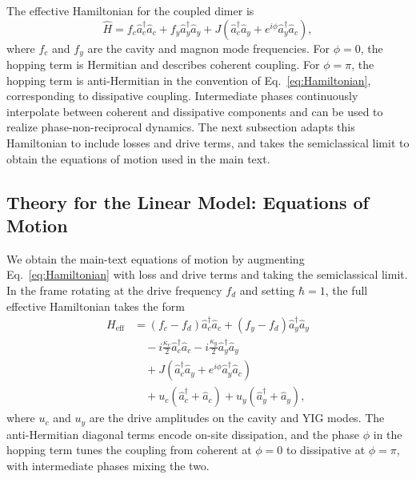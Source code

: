 \documentclass[%
  reprint,
  amsmath,amssymb,
  aps,
  prapplied,
  superscriptaddress,
  longbibliography]{revtex4-2}
\begin{document}
The effective Hamiltonian for the coupled dimer is
\begin{equation}\label{eq:Hamiltonian}
\hat{H} = f_c \hat{a}_c^\dagger \hat{a}_c + f_y \hat{a}_y^\dagger \hat{a}_y + J \left( \hat{a}_c^\dagger \hat{a}_y + e^{i\phi} \hat{a}_y^\dagger \hat{a}_c \right),
\end{equation}
where $f_c$ and $f_y$ are the cavity and magnon mode frequencies. For $\phi=0$, the hopping term is Hermitian and describes coherent coupling. For $\phi=\pi$, the hopping term is anti-Hermitian in the convention of Eq.~\ref{eq:Hamiltonian}, corresponding to dissipative coupling. Intermediate phases continuously interpolate between coherent and dissipative components and can be used to realize phase-non-reciprocal dynamics. The next subsection adapts this Hamiltonian to include losses and drive terms, and takes the semiclassical limit to obtain the equations of motion used in the main text.

\subsection{Theory for the Linear Model: Equations of Motion}

We obtain the main-text equations of motion by augmenting Eq.~\ref{eq:Hamiltonian} with loss and drive terms and taking the semiclassical limit. In the frame rotating at the drive frequency $f_d$ and setting $\hbar = 1$, the full effective Hamiltonian takes the form
\begin{align}
H_{\text{eff}} &= (f_c - f_d) \hat{a}_c^\dagger \hat{a}_c + (f_y - f_d) \hat{a}_y^\dagger \hat{a}_y \nonumber \\
&\quad - i \frac{\kappa_c}{2} \hat{a}_c^\dagger \hat{a}_c - i \frac{\kappa_y}{2} \hat{a}_y^\dagger \hat{a}_y \nonumber \\
&\quad + J \left( \hat{a}_c^\dagger \hat{a}_y + e^{i\phi} \hat{a}_y^\dagger \hat{a}_c \right) \nonumber \\
&\quad + u_c (\hat{a}_c^\dagger + \hat{a}_c) + u_y (\hat{a}_y^\dagger + \hat{a}_y),
\end{align}
where $u_c$ and $u_y$ are the drive amplitudes on the cavity and YIG modes. The anti-Hermitian diagonal terms encode on-site dissipation, and the phase $\phi$ in the hopping term tunes the coupling from coherent at $\phi=0$ to dissipative at $\phi=\pi$, with intermediate phases mixing the two.
\end{document}
